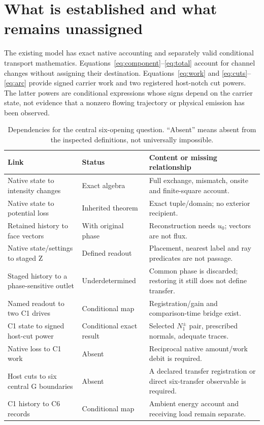 \section{What is established and what remains unassigned}
The existing model has exact native accounting and separately valid conditional transport mathematics. Equations~\eqref{eq:component}--\eqref{eq:total} account for channel changes without assigning their destination. Equations~\eqref{eq:work} and \eqref{eq:cuts}--\eqref{eq:arc} provide signed carrier work and two registered host-notch cut powers. The latter powers are conditional expressions whose signs depend on the carrier state, not evidence that a nonzero flowing trajectory or physical emission has been observed.

\begin{table}[htbp]\centering\small
\caption{Dependencies for the central six-opening question. ``Absent'' means absent from the inspected definitions, not universally impossible.}\label{tab:interfaces}
\begin{tabularx}{\textwidth}{@{}>{\raggedright\arraybackslash}p{}>{\raggedright\arraybackslash}p{}Y@{}}\toprule
Link & Status & Content or missing relationship\\\midrule
Native state to intensity changes & Exact algebra & Full exchange, mismatch, onsite and finite-square account.\\
Native state to potential loss & Inherited theorem & Exact tuple/domain; no exterior recipient.\\
Retained history to face vectors & With original phase & Reconstruction needs $u_0$; vectors are not flux.\\
Native state/settings to staged Z & Defined readout & Placement, nearest label and ray predicates are not passage.\\
Staged history to a phase-sensitive outlet & Underdetermined & Common phase is discarded; restoring it still does not define transfer.\\
Named readout to two C1 drives & Conditional map & Registration/gain and comparison-time bridge exist.\\
C1 state to signed host-cut power & Conditional exact result & Selected $N_1^\pm$ pair, prescribed normals, adequate traces.\\
Native loss to C1 work & Absent & Reciprocal native amount/work debit is required.\\
Host cuts to six central G boundaries & Absent & A declared transfer registration or direct six-transfer observable is required.\\
C1 history to C6 records & Conditional map & Ambient energy account and receiving load remain separate.\\\bottomrule
\end{tabularx}
\end{table}

